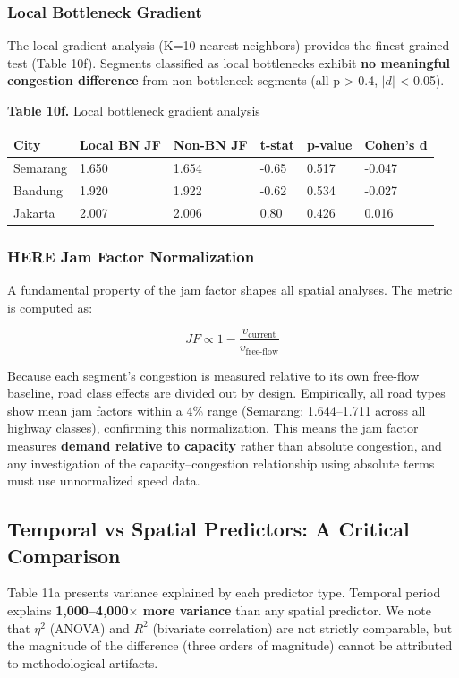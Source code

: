 \documentclass[12pt,a4paper]{article}
\begin{document}
\subsubsection{Local Bottleneck Gradient}

The local gradient analysis (K=10 nearest neighbors) provides the finest-grained test (Table 10f). Segments classified as local bottlenecks exhibit \textbf{no meaningful congestion difference} from non-bottleneck segments (all p > 0.4, $|d|$ < 0.05).

\textbf{Table 10f.} Local bottleneck gradient analysis

\begin{longtable}[]{@{}llllll@{}}
\toprule\noalign{}
City & Local BN JF & Non-BN JF & t-stat & p-value & Cohen's d \\
\midrule\noalign{}
\endhead
\bottomrule\noalign{}
\endlastfoot
Semarang & 1.650 & 1.654 & -0.65 & 0.517 & -0.047 \\
Bandung & 1.920 & 1.922 & -0.62 & 0.534 & -0.027 \\
Jakarta & 2.007 & 2.006 & 0.80 & 0.426 & 0.016 \\
\end{longtable}

\subsubsection{HERE Jam Factor Normalization}

A fundamental property of the jam factor shapes all spatial analyses. The metric is computed as:

\[JF \propto 1 - \frac{v_{\text{current}}}{v_{\text{free-flow}}}\]

Because each segment's congestion is measured relative to its own free-flow baseline, road class effects are divided out by design. Empirically, all road types show mean jam factors within a 4\% range (Semarang: 1.644--1.711 across all highway classes), confirming this normalization. This means the jam factor measures \textbf{demand relative to capacity} rather than absolute congestion, and any investigation of the capacity--congestion relationship using absolute terms must use unnormalized speed data.

\subsection{Temporal vs Spatial Predictors: A Critical Comparison}

Table 11a presents variance explained by each predictor type. Temporal period explains \textbf{1,000--4,000$\times$ more variance} than any spatial predictor. We note that $\eta^2$ (ANOVA) and $R^2$ (bivariate correlation) are not strictly comparable, but the magnitude of the difference (three orders of magnitude) cannot be attributed to methodological artifacts.
\end{document}
